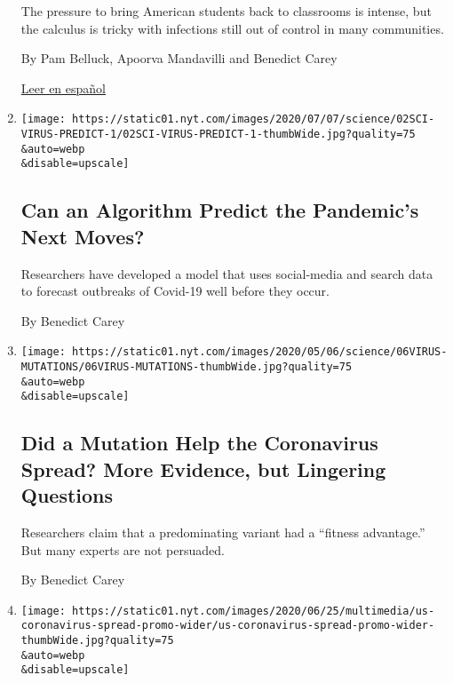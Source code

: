 \begin{enumerate}
  The pressure to bring American students back to classrooms is intense,
  but the calculus is tricky with infections still out of control in
  many communities.

  By Pam Belluck, Apoorva Mandavilli and Benedict Carey

  \href{https://www.nytimes.com/es/2020/07/27/espanol/ciencia-y-tecnologia/regreso-a-clases-coronavirus.html}{Leer
  en español}
\item
  \href{/2020/07/02/health/santillana-coronavirus-model-forecast.html}{}

  \texttt{[image: https://static01.nyt.com/images/2020/07/07/science/02SCI-VIRUS-PREDICT-1/02SCI-VIRUS-PREDICT-1-thumbWide.jpg?quality=75\\\&auto=webp\\\&disable=upscale]}

  \hypertarget{can-an-algorithm-predict-the-pandemics-next-moves}{%
  \subsection{Can an Algorithm Predict the Pandemic's Next
  Moves?}\label{can-an-algorithm-predict-the-pandemics-next-moves}}

  Researchers have developed a model that uses social-media and search
  data to forecast outbreaks of Covid-19 well before they occur.

  By Benedict Carey
\item
  \href{/2020/07/02/health/coronavirus-korber-mutation.html}{}

  \texttt{[image: https://static01.nyt.com/images/2020/05/06/science/06VIRUS-MUTATIONS/06VIRUS-MUTATIONS-thumbWide.jpg?quality=75\\\&auto=webp\\\&disable=upscale]}

  \hypertarget{did-a-mutation-help-the-coronavirus-spread-more-evidence-but-lingering-questions}{%
  \subsection{Did a Mutation Help the Coronavirus Spread? More Evidence,
  but Lingering
  Questions}\label{did-a-mutation-help-the-coronavirus-spread-more-evidence-but-lingering-questions}}

  Researchers claim that a predominating variant had a ``fitness
  advantage.'' But many experts are not persuaded.

  By Benedict Carey
\item
  \href{/interactive/2020/us/coronavirus-spread.html}{}

  \texttt{[image: https://static01.nyt.com/images/2020/06/25/multimedia/us-coronavirus-spread-promo-wider/us-coronavirus-spread-promo-wider-thumbWide.jpg?quality=75\\\&auto=webp\\\&disable=upscale]}


\end{enumerate}
